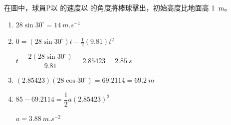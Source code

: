 {
    在圖中，球員P以  的速度以  的角度將棒球擊出，初始高度比地面高 \qty{1}{m}。


    \clearpage{}
}{
    \begin{enumerate}
        \item $28\sin 30^\circ=\qty{14}{m.s^{-1}}$\giveA
        \item $0=(28\sin 30^\circ)t-\frac{1}{2}(9.81)t^2$\giveM\par
              $t=\dfrac{2(28\sin 30^\circ)}{9.81}=2.85423=\qty{2.85}{s}$\giveA
        \item $(2.85423)(28\cos 30^\circ)=69.2114=\qty{69.2}{m}$\giveMA
        \item $85-69.2114=\dfrac{1}{2}a(2.85423)^2$ \giveM \par
              $a=\qty{3.88}{m.s^{-2}}$\giveA
    \end{enumerate}
}

